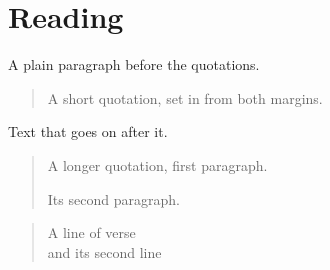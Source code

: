 \documentclass{article}
\begin{document}
\section{Reading}
A plain paragraph before the quotations.

\begin{quote}
A short quotation, set in from both margins.
\end{quote}
Text that goes on after it.

\begin{quotation}
A longer quotation, first paragraph.

Its second paragraph.
\end{quotation}

\begin{verse}
A line of verse\\
and its second line
\end{verse}
\end{document}

